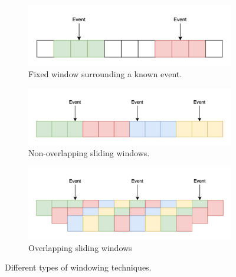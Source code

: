 \begin{figure}[ht]
    \centering
    \begin{subfigure}{0.45\textwidth}
        \centering
        \includegraphics[width=\textwidth]{../images/pipeline/fixed_window.pdf}
        \captionsetup{width=\linewidth}
        \captionsetup{justification=centering}
        \caption{Fixed window surrounding a known event.}
        \label{fig:processing_signals_windowing_non_fixed}
    \end{subfigure}
    \hfill
    \begin{subfigure}{0.45\textwidth}
        \centering
        \includegraphics[width=\textwidth]{../images/pipeline/non_overlapping_window.pdf}
        \captionsetup{width=\linewidth}
        \captionsetup{justification=centering}
        \caption{Non-overlapping sliding windows.}
        \label{fig:processing_signals_windowing_non_overlapping}
    \end{subfigure}
    \hfill
    \begin{subfigure}{0.45\textwidth}
        \centering
        \includegraphics[width=\textwidth]{../images/pipeline/overlapping_window.pdf}
        \captionsetup{width=\linewidth}
        \captionsetup{justification=centering}
        \caption{Overlapping sliding windows}
        \label{fig:processing_signals_windowing_overlapping}
    \end{subfigure}
    \captionsetup{width=\linewidth}
    \captionsetup{justification=centering}
    \caption{Different types of windowing techniques.}
    \label{fig:processing_signals_windowing}
\end{figure}

